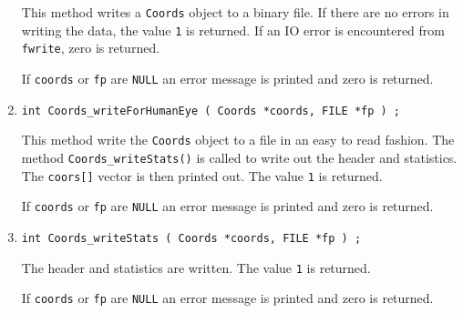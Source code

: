 \begin{enumerate}
\par
This method writes a {\tt Coords} object to a binary file.
If there are no errors in writing the data, 
the value {\tt 1} is returned.
If an IO error is encountered from {\tt fwrite}, zero is returned.
\par {}
If {\tt coords} or {\tt fp} are {\tt NULL} 
an error message is printed and zero is returned.
\item
\begin{verbatim}
int Coords_writeForHumanEye ( Coords *coords, FILE *fp ) ;
\end{verbatim}
\par
This method write the {\tt Coords} object to a file in an easy to
read fashion.
The method {\tt Coords\_writeStats()} is called to write out the
header and statistics. 
The {\tt coors[]} vector is then printed out.
The value {\tt 1} is returned.
\par {}
If {\tt coords} or {\tt fp} are {\tt NULL} 
an error message is printed and zero is returned.
\item
\begin{verbatim}
int Coords_writeStats ( Coords *coords, FILE *fp ) ;
\end{verbatim}
\par
The header and statistics are written.
The value {\tt 1} is returned.
\par {}
If {\tt coords} or {\tt fp} are {\tt NULL} an error message 
is printed and zero is returned.
\end{enumerate}
